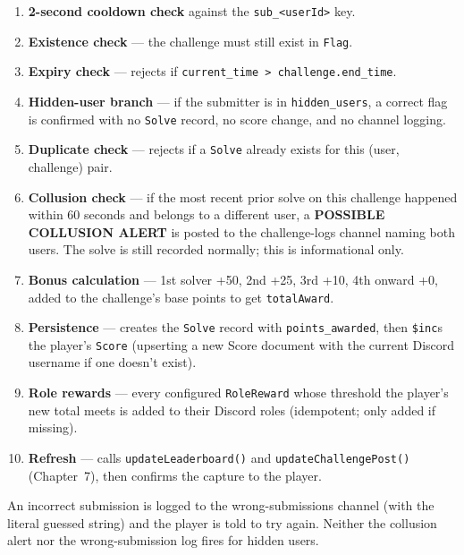 \documentclass[12pt,a4paper]{report}
\begin{document}
\begin{enumerate}
    \item \textbf{2-second cooldown check} against the \texttt{sub\_<userId>} key.
    \item \textbf{Existence check} --- the challenge must still exist in \texttt{Flag}.
    \item \textbf{Expiry check} --- rejects if \texttt{current\_time > challenge.end\_time}.
    \item \textbf{Hidden-user branch} --- if the submitter is in \texttt{hidden\_users}, a correct
          flag is confirmed with no \texttt{Solve} record, no score change, and no channel logging.
    \item \textbf{Duplicate check} --- rejects if a \texttt{Solve} already exists for this
          (user, challenge) pair.
    \item \textbf{Collusion check} --- if the most recent prior solve on this challenge happened
          within 60 seconds and belongs to a different user, a \textbf{POSSIBLE COLLUSION ALERT}
          is posted to the challenge-logs channel naming both users. The solve is still recorded
          normally; this is informational only.
    \item \textbf{Bonus calculation} --- 1st solver +50, 2nd +25, 3rd +10, 4th onward +0, added to
          the challenge's base points to get \texttt{totalAward}.
    \item \textbf{Persistence} --- creates the \texttt{Solve} record with \texttt{points\_awarded},
          then \texttt{\$inc}s the player's \texttt{Score} (upserting a new Score document with the
          current Discord username if one doesn't exist).
    \item \textbf{Role rewards} --- every configured \texttt{RoleReward} whose threshold the
          player's new total meets is added to their Discord roles (idempotent; only added if
          missing).
    \item \textbf{Refresh} --- calls \texttt{updateLeaderboard()} and
          \texttt{updateChallengePost()} (Chapter~7), then confirms the capture to the player.
\end{enumerate}

An incorrect submission is logged to the wrong-submissions channel (with the literal guessed
string) and the player is told to try again. Neither the collusion alert nor the wrong-submission
log fires for hidden users.
\end{document}
